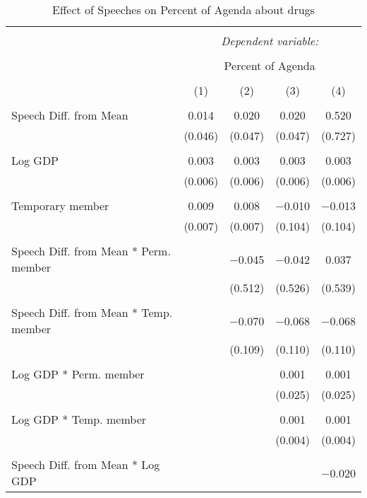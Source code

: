 
\begin{table}[!htbp] \centering 
  \caption{Effect of Speeches on Percent of Agenda about drugs} 
  \label{} 
\begin{tabular}{@{\extracolsep{5pt}}lcccc} 
\\[-1.8ex]\hline 
\hline \\[-1.8ex] 
 & \multicolumn{4}{c}{\textit{Dependent variable:}} \\ 
\cline{2-5} 
\\[-1.8ex] & \multicolumn{4}{c}{Percent of Agenda} \\ 
\\[-1.8ex] & (1) & (2) & (3) & (4)\\ 
\hline \\[-1.8ex] 
 Speech Diff. from Mean & 0.014 & 0.020 & 0.020 & 0.520 \\ 
  & (0.046) & (0.047) & (0.047) & (0.727) \\ 
  & & & & \\ 
 Log GDP & 0.003 & 0.003 & 0.003 & 0.003 \\ 
  & (0.006) & (0.006) & (0.006) & (0.006) \\ 
  & & & & \\ 
 Temporary member & 0.009 & 0.008 & $-$0.010 & $-$0.013 \\ 
  & (0.007) & (0.007) & (0.104) & (0.104) \\ 
  & & & & \\ 
 Speech Diff. from Mean * Perm. member &  & $-$0.045 & $-$0.042 & 0.037 \\ 
  &  & (0.512) & (0.526) & (0.539) \\ 
  & & & & \\ 
 Speech Diff. from Mean * Temp. member &  & $-$0.070 & $-$0.068 & $-$0.068 \\ 
  &  & (0.109) & (0.110) & (0.110) \\ 
  & & & & \\ 
 Log GDP * Perm. member &  &  & 0.001 & 0.001 \\ 
  &  &  & (0.025) & (0.025) \\ 
  & & & & \\ 
 Log GDP * Temp. member &  &  & 0.001 & 0.001 \\ 
  &  &  & (0.004) & (0.004) \\ 
  & & & & \\ 
 Speech Diff. from Mean * Log GDP &  &  &  & $-$0.020 \\ 

\end{tabular}
\end{table}
